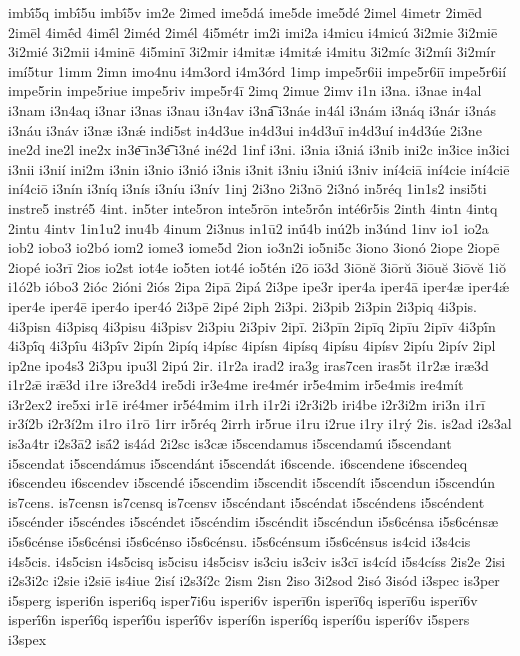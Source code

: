{imbī́5q
imbī́5u
imbī́5v
im2e
2imed
ime5dá
ime5de
ime5dé
2imel
4imetr
2imēd
2imēl
4imḗd
4imḗl
2iméd
2imél
4i5métr
im2i
imi2a
i4micu
i4micú
3i2mie
3i2miē
3i2mié
3i2mii
i4minē
4i5minī
3i2mir
i4mitæ
i4mitǽ
i4mitu
3i2míc
3i2míi
3i2mír
imí5tur
1imm
2imn
imo4nu
i4m3ord
i4m3órd
1imp
impe5r6ii
impe5r6iī
impe5r6ií
impe5rin
impe5riue
impe5riv
impe5r4ī
2imq
2imue
2imv
i1n
i3na.
i3nae
in4al
i3nam
i3n4aq
i3nar
i3nas
i3nau
i3n4av
i3na͡
i3náe
in4ál
i3nám
i3náq
i3nár
i3nás
i3náu
i3náv
i3næ
i3nǽ
indi5st
in4d3ue
in4d3ui
in4d3uī
in4d3uí
in4d3úe
2i3ne
ine2d
ine2l
ine2x
in3e͞
in3e͡
i3né
iné2d
1inf
i3ni.
i3nia
i3niá
i3nib
ini2c
in3ice
in3ici
i3nii
i3nií
ini2m
i3nin
i3nio
i3nió
i3nis
i3nit
i3niu
i3niú
i3niv
iní4ciā
iní4cie
iní4ciē
iní4ciō
i3nín
i3níq
i3nís
i3níu
i3nív
1inj
2i3no
2i3nō
2i3nó
in5réq
1in1s2
insi5ti
instre5
instré5
4int.
in5ter
inte5ron
inte5rōn
inte5rṓn
inté6r5is
2inth
4intn
4intq
2intu
4intv
1in1u2
inu4b
4inum
2i3nus
in1ū2
inū́4b
inú2b
in3únd
1inv
io1
io2a
iob2
iobo3
io2bó
iom2
iome3
iome5d
2ion
io3n2i
io5ni5c
3iono
3ionó
2iope
2iopē
2iopé
io3rī
2ios
io2st
iot4e
io5ten
iot4é
io5tén
i2ō
iō3d
3iōnĕ
3iōrŭ
3iōuĕ
3iōvĕ
1iŏ
i1ó2b
ióbo3
2ióc
2ióni
2iós
2ipa
2ipā
2ipá
2i3pe
ipe3r
iper4a
iper4ā
iper4æ
iper4ǽ
iper4e
iper4ē
iper4o
iper4ó
2i3pē
2ipé
2iph
2i3pi.
2i3pib
2i3pin
2i3piq
4i3pis.
4i3pisn
4i3pisq
4i3pisu
4i3pisv
2i3piu
2i3piv
2ipī.
2i3pīn
2ipīq
2ipīu
2ipīv
4i3pī́n
4i3pī́q
4i3pī́u
4i3pī́v
2ipín
2ipíq
i4písc
4ipísn
4ipísq
4ipísu
4ipísv
2ipíu
2ipív
2ipl
ip2ne
ipo4s3
2i3pu
ipu3l
2ipú
2ir.
i1r2a
irad2
ira3g
iras7cen
iras5t
i1r2æ
iræ3d
i1r2ǣ
irǣ3d
i1re
i3re3d4
ire5di
ir3e4me
ire4mér
ir5e4mim
ir5e4mis
ire4mít
i3r2ex2
ire5xi
ir1ē
iré4mer
ir5é4mim
i1rh
i1r2i
i2r3i2b
iri4be
i2r3i2m
iri3n
i1rī
ir3í2b
i2r3í2m
i1ro
i1rō
1irr
ir5réq
2irrh
ir5rue
i1ru
i2rue
i1ry
i1rý
2is.
is2ad
i2s3al
is3a4tr
i2s3ā2
isā́2
is4ád
2i2sc
is3cæ
i5scendamus
i5scendamú
i5scendant
i5scendat
i5scendámus
i5scendánt
i5scendát
i6scende.
i6scendene
i6scendeq
i6scendeu
i6scendev
i5scendé
i5scendim
i5scendit
i5scendít
i5scendun
i5scendún
is7cens.
is7censn
is7censq
is7censv
i5scéndant
i5scéndat
i5scéndens
i5scéndent
i5scénder
i5scéndes
i5scéndet
i5scéndim
i5scéndit
i5scéndun
i5s6cénsa
i5s6cénsæ
i5s6cénse
i5s6cénsi
i5s6cénso
i5s6cénsu.
i5s6cénsum
i5s6cénsus
is4cid
i3s4cis
i4s5cis.
i4s5cisn
i4s5cisq
is5cisu
i4s5cisv
is3ciu
is3civ
is3cī
is4cíd
i5s4císs
2is2e
2isi
i2s3i2c
i2sie
i2siē
is4iue
2isí
i2s3í2c
2ism
2isn
2iso
3i2sod
2isó
3isód
i3spec
is3per
i5sperg
isperi6n
isperi6q
isper7i6u
isperi6v
isperī6n
isperī6q
isperī6u
isperī6v
isperī́6n
isperī́6q
isperī́6u
isperī́6v
isperí6n
isperí6q
isperí6u
isperí6v
i5spers
i3spex
}
